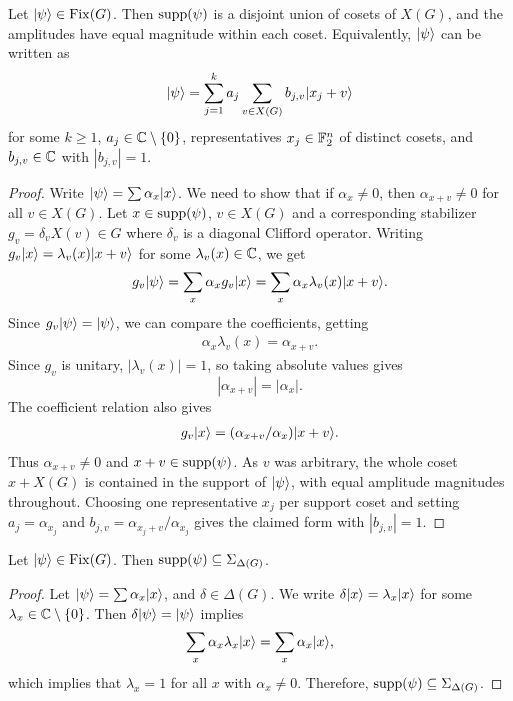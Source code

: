 \begin{lemma}\label{lem:supp-partition}
    Let $|\psi\rangle \in \operatorname{Fix}(G)$. Then $\operatorname{supp}(\psi)$ is a disjoint union of cosets of $X(G)$, and the amplitudes have equal magnitude within each coset. Equivalently, $|\psi\rangle$ can be written as
    \begin{align}
        |\psi\rangle = \sum_{j=1}^k a_j \sum_{v \in X(G)} b_{j,v} |x_j + v\rangle
    \end{align}
    for some $k \geq 1$, $a_j \in \mathbb{C} \setminus \{0\}$, representatives $x_j \in \mathbb{F}_2^n$ of distinct cosets, and $b_{j,v} \in \mathbb{C}$ with $|b_{j,v}|=1$.
\end{lemma}
\begin{proof}
    Write $|\psi\rangle = \sum \alpha_x |x\rangle$. We need to show that if $\alpha_x \neq 0$, then $\alpha_{x+v} \neq 0$ for all $v \in X(G)$. Let $x \in \operatorname{supp}(\psi)$, $v \in X(G)$ and a corresponding stabilizer $g_v = \delta_v X(v) \in G$ where $\delta_v$ is a diagonal Clifford operator. Writing $g_v |x\rangle = \lambda_v(x) |x+v\rangle$ for some $\lambda_v(x) \in \mathbb{C}$, we get
    \begin{align}
        g_v |\psi\rangle = \sum_{x} \alpha_x g_v |x\rangle = \sum_{x} \alpha_x \lambda_v(x) |x+v\rangle.
    \end{align}
    Since $g_v |\psi\rangle = |\psi\rangle$, we can compare the coefficients, getting
    \begin{align}
        \alpha_x \lambda_v(x) = \alpha_{x+v}.
    \end{align}
    Since $g_v$ is unitary, $|\lambda_v(x)|=1$, so taking absolute values gives
    \[
        |\alpha_{x+v}|=|\alpha_x|.
    \]
    The coefficient relation also gives
    \begin{align}
        g_v |x\rangle = (\alpha_{x+v}/\alpha_x) |x+v\rangle.
    \end{align}
    Thus $\alpha_{x+v} \neq 0$ and $x+v \in \operatorname{supp}(\psi)$. As $v$ was arbitrary, the whole coset $x + X(G)$ is contained in the support of $|\psi\rangle$, with equal amplitude magnitudes throughout. Choosing one representative $x_j$ per support coset and setting $a_j=\alpha_{x_j}$ and $b_{j,v}=\alpha_{x_j+v}/\alpha_{x_j}$ gives the claimed form with $|b_{j,v}|=1$.
\end{proof}

\begin{lemma}\label{lem:supp-in-sigma}
    Let $|\psi\rangle \in \operatorname{Fix}(G)$. Then $\operatorname{supp}(\psi) \subseteq \Sigma_{\Delta(G)}$.
\end{lemma}
\begin{proof}
    Let $|\psi\rangle = \sum \alpha_x |x\rangle$, and $\delta \in \Delta(G)$. We write $\delta |x\rangle = \lambda_x |x\rangle$ for some $\lambda_x \in \mathbb{C} \setminus \{0\}$. Then $\delta |\psi\rangle = |\psi\rangle$ implies
    \begin{align}
        \sum_x \alpha_x \lambda_x |x\rangle = \sum_x \alpha_x |x\rangle,
    \end{align}
    which implies that $\lambda_x = 1$ for all $x$ with $\alpha_x \neq 0$. Therefore, $\operatorname{supp}(\psi) \subseteq \Sigma_{\Delta(G)}$.
\end{proof}


